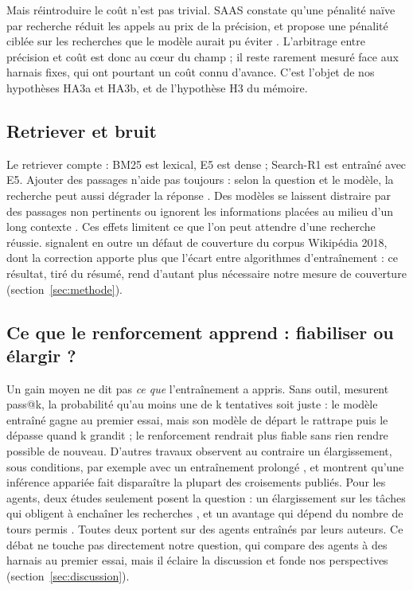 Mais réintroduire le coût n'est pas trivial. SAAS constate qu'une pénalité naïve par recherche réduit les appels au prix de la précision, et propose une pénalité ciblée sur les recherches que le modèle aurait pu éviter \citep{tang2026saas}. L'arbitrage entre précision et coût est donc au cœur du champ ; il reste rarement mesuré face aux harnais fixes, qui ont pourtant un coût connu d'avance. C'est l'objet de nos hypothèses HA3a et HA3b, et de l'hypothèse H3 du mémoire.

\subsection{Retriever et bruit}
Le retriever compte : BM25 \citep{robertson2009probabilistic} est lexical, E5 \citep{wang2022text} est dense ; Search-R1 est entraîné avec E5. Ajouter des passages n'aide pas toujours : selon la question et le modèle, la recherche peut aussi dégrader la réponse \citep{maekawa2024retrieval}. Des modèles se laissent distraire par des passages non pertinents \citep{yoran2023making} ou ignorent les informations placées au milieu d'un long contexte \citep{liu2023lost}. Ces effets limitent ce que l'on peut attendre d'une recherche réussie. \citet{zhao2026retrieval} signalent en outre un défaut de couverture du corpus Wikipédia 2018, dont la correction apporte plus que l'écart entre algorithmes d'entraînement : ce résultat, tiré du résumé, rend d'autant plus nécessaire notre mesure de couverture (section~\ref{sec:methode}).

\subsection{Ce que le renforcement apprend : fiabiliser ou élargir ?}
Un gain moyen ne dit pas \emph{ce que} l'entraînement a appris. Sans outil, \citet{yue2025does} mesurent pass@k, la probabilité qu'au moins une de k tentatives soit juste : le modèle entraîné gagne au premier essai, mais son modèle de départ le rattrape puis le dépasse quand k grandit ; le renforcement rendrait plus fiable sans rien rendre possible de nouveau. D'autres travaux observent au contraire un élargissement, sous conditions, par exemple avec un entraînement prolongé \citep{liu2025prorl}, et \citet{yang2026crossovers} montrent qu'une inférence appariée fait disparaître la plupart des croisements publiés. Pour les agents, deux études seulement posent la question : un élargissement sur les tâches qui obligent à enchaîner les recherches \citep{zhai2026does}, et un avantage qui dépend du nombre de tours permis \citep{zhu2026what}. Toutes deux portent sur des agents entraînés par leurs auteurs. Ce débat ne touche pas directement notre question, qui compare des agents à des harnais au premier essai, mais il éclaire la discussion et fonde nos perspectives (section~\ref{sec:discussion}).

